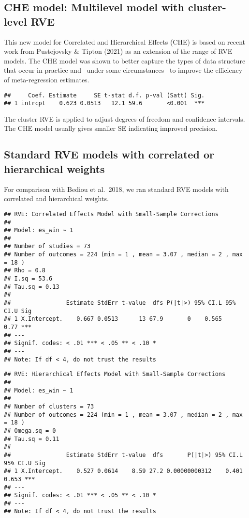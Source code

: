 \documentclass[
]{book}
\begin{document}
\hypertarget{che-model-multilevel-model-with-cluster-level-rve}{%
\subsection{CHE model: Multilevel model with cluster-level RVE}\label{che-model-multilevel-model-with-cluster-level-rve}}

This new model for Correlated and Hierarchical Effects (CHE) is based on recent work
from Pustejovsky \& Tipton (2021) as an extension of the range of RVE models.
The CHE model was shown to better capture the types of data structure that
occur in practice and --under some circumstances-- to improve the efficiency of
meta-regression estimates.

\begin{verbatim}
##     Coef. Estimate     SE t-stat d.f. p-val (Satt) Sig.
## 1 intrcpt    0.623 0.0513   12.1 59.6       <0.001  ***
\end{verbatim}

The cluster RVE is applied to adjust degrees of freedom and confidence intervals.\\
The CHE model usually gives smaller SE indicating improved precision.

\hypertarget{standard-rve-models-with-correlated-or-hierarchical-weights}{%
\subsection{Standard RVE models with correlated or hierarchical weights}\label{standard-rve-models-with-correlated-or-hierarchical-weights}}

For comparison with Bediou et al.~2018, we ran standard RVE models with correlated
and hierarchical weights.

\begin{verbatim}
## RVE: Correlated Effects Model with Small-Sample Corrections 
## 
## Model: es_win ~ 1 
## 
## Number of studies = 73 
## Number of outcomes = 224 (min = 1 , mean = 3.07 , median = 2 , max = 18 )
## Rho = 0.8 
## I.sq = 53.6 
## Tau.sq = 0.13 
## 
##                Estimate StdErr t-value  dfs P(|t|>) 95% CI.L 95% CI.U Sig
## 1 X.Intercept.    0.667 0.0513      13 67.9       0    0.565     0.77 ***
## ---
## Signif. codes: < .01 *** < .05 ** < .10 *
## ---
## Note: If df < 4, do not trust the results
\end{verbatim}

\begin{verbatim}
## RVE: Hierarchical Effects Model with Small-Sample Corrections 
## 
## Model: es_win ~ 1 
## 
## Number of clusters = 73 
## Number of outcomes = 224 (min = 1 , mean = 3.07 , median = 2 , max = 18 )
## Omega.sq = 0 
## Tau.sq = 0.11 
## 
##                Estimate StdErr t-value  dfs       P(|t|>) 95% CI.L 95% CI.U Sig
## 1 X.Intercept.    0.527 0.0614    8.59 27.2 0.00000000312    0.401    0.653 ***
## ---
## Signif. codes: < .01 *** < .05 ** < .10 *
## ---
## Note: If df < 4, do not trust the results
\end{verbatim}
\end{document}
